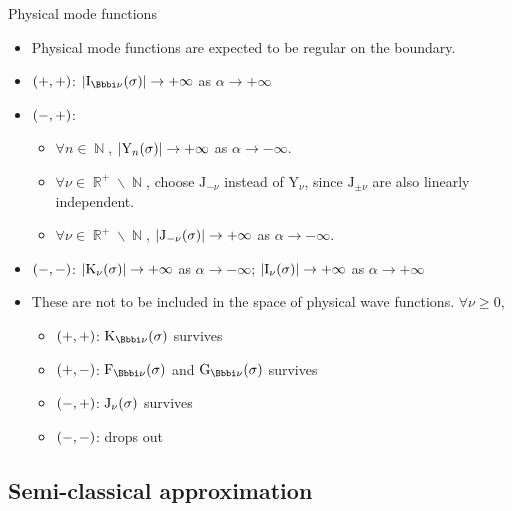 \documentclass[9pt]{beamer}
\begin{document}
\begin{frame}
{Physical mode functions}%
\begin{itemize}
\item Physical mode functions are expected to be regular on the boundary.
\item ${\left(+,+\right)}$: $\vbr{\rfun{\mathrm{I}_{\ii\nu}}{\sigma}} \to +\infty$
as $\alpha \to +\infty$
\item ${\left(-,+\right)}$: 
\begin{itemize}
\item
$\forall n \in \BbbN$, ${\left|{\mathrm{Y}_{n}}\mathopen{}\left(\sigma\right)\mathclose{}\right|} \to +\infty$ as 
$\alpha \to -\infty$.
\item
$\forall\nu\in\BbbR^+\backslash\BbbN$, choose $\mathrm{J}_{-\nu}$ instead of 
$\mathrm{Y}_{\nu}$, since $\mathrm{J}_{\pm\nu}$ are also linearly independent.
\item
$\forall\nu\in\BbbR^+\backslash\BbbN$, ${\left|{\mathrm{J}_{-\nu}}\mathopen{}\left(\sigma\right)\mathclose{}\right|} 
\to +\infty$ as $\alpha \to -\infty$.
\end{itemize}
\item ${\left(-,-\right)}$: ${\left|{\mathrm{K}_{\nu}}\mathopen{}\left(\sigma\right)\mathclose{}\right|} \to +\infty$
as $\alpha \to -\infty$; ${\left|{\mathrm{I}_{\nu}}\mathopen{}\left(\sigma\right)\mathclose{}\right|} \to +\infty$
as $\alpha \to +\infty$
\item These are not to be included in the space of physical wave 
functions. $\forall \nu \ge 0$,
\begin{itemize}
\item ${\left(+,+\right)}$: $\rfun{\mathrm{K}_{\ii\nu}}{\sigma}$ survives
\item ${\left(+,-\right)}$: $\rfun{\mathrm{F}_{\ii\nu}}{\sigma}$ and
$\rfun{\mathrm{G}_{\ii\nu}}{\sigma}$ survives
\item ${\left(-,+\right)}$: ${\mathrm{J}_{\nu}}\mathopen{}\left(\sigma\right)\mathclose{}$ survives
\item ${\left(-,-\right)}$: drops out
\end{itemize}
\end{itemize}

\end{frame}

\subsection{Semi-classical approximation}
\end{document}
